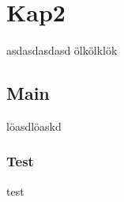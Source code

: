 \chapter{Kap2}
asdasdasdasd\cite{:ae}
ölkölklök\cite{Abubakar:2016aa}
\section{Main}
löasdlöaskd
\subsection{Test}
test
\blindtext
